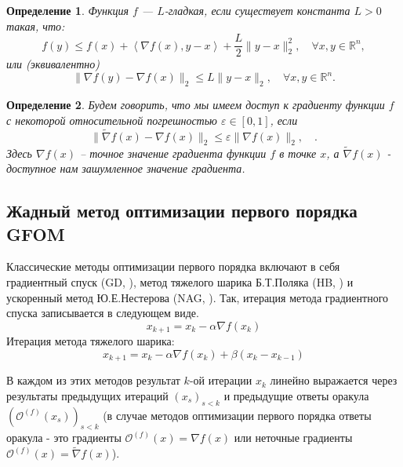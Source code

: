 \documentclass{article}
\newtheorem{Def}{Определение}[section]
\begin{document}
\begin{Def}
Функция $f$ --- $L$-гладкая, если существует константа $L > 0$ такая, что:
\begin{equation}\label{smoothness_cond}
    f(y) \leq f(x)+ \left\langle\nabla f(x), y-x\right\rangle + \frac{L}{2} \|y-x\|_2^2, \quad \forall x, y \in \mathbb{R}^n,
\end{equation}
или (эквивалентно) 
\begin{equation}\label{eq_6}
    \|\nabla f(y) - \nabla f(x)\|_2 \leq L \|y - x\|_2, \quad \forall x, y \in \mathbb{R}^n.
\end{equation}
\end{Def}

\begin{Def} \label{inexact_grad}
Будем говорить, что мы имеем доступ к градиенту функции $f$ с некоторой относительной погрешностью $\varepsilon \in [0, 1]$, если
\begin{equation}\label{eq_relative_error}
    \|\widetilde{\nabla} f(x) - \nabla f(x)\|_2 \leq \varepsilon\|\nabla f(x)\|_2, \quad.
\end{equation}
Здесь $\nabla f(x)$ -- точное значение градиента функции $f$ в точке $x$, а $\widetilde{\nabla} f(x)$ - доступное нам зашумленное значение градиента.
\end{Def}


\subsection{Жадный метод оптимизации первого порядка GFOM}



Классические методы оптимизации первого порядка включают в себя градиентный спуск (GD, \cite{cauchy1847methode}), метод тяжелого шарика Б.Т.Поляка (HB, \cite{polyak1963gradient}) и ускоренный метод Ю.Е.Нестерова (NAG, \cite{nesterov1983method}). Так, итерация метода градиентного спуска записывается в следующем виде.
\[x_{k+1}  = x_k - \alpha \nabla f(x_k) \tag{GD}\]
Итерация метода тяжелого шарика:
\[x_{k+1} = x_k - \alpha \nabla f(x_k) + \beta (x_k - x_{k - 1})\tag{HB}\]

В каждом из этих методов результат $k$-ой итерации $x_k$ линейно выражается через результаты предыдущих итераций $(x_s)_{s < k}$ и предыдущие ответы оракула $(\mathcal{O}^{(f)}(x_s))_{s < k}$ (в случае методов оптимизации первого порядка ответы оракула - это градиенты $\mathcal{O}^{(f)}(x) = \nabla f(x)$ или неточные градиенты $\mathcal{O}^{(f)}(x) = \widetilde{\nabla} f(x)$).
\end{document}
